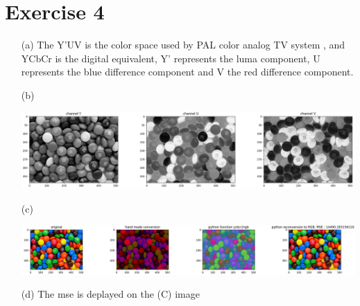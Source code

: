\documentclass[a4paper]{article}
\begin{document}
\section*{Exercise 4}
\begin{itemize}
\item[(a)] The Y'UV is the color space used by PAL color analog TV system , and YCbCr is the digital equivalent, Y' represents the luma component, U represents the blue difference component and V the red difference component.
\item[(b)]
\begin{center}
\includegraphics[width=1\textwidth]{images/exercice_4_b.PNG}\\[1cm] 
\end{center}
\item[(c)]
\begin{center}
\includegraphics[width=1\textwidth]{images/exercice_4_c.PNG}\\[1cm] 
\end{center}
\item[(d)] The mse is deplayed on the (C) image 
\end{itemize}
\end{document}
